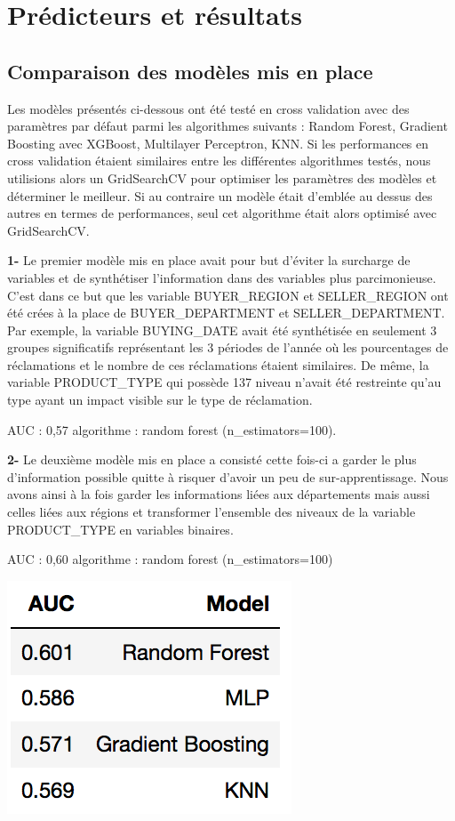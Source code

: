 
\chapter{Prédicteurs et résultats}

\section{Comparaison des modèles mis en place}

Les modèles présentés ci-dessous ont été testé en cross validation avec des
paramètres par défaut parmi les algorithmes suivants : Random Forest, Gradient Boosting 
avec XGBoost, Multilayer Perceptron, KNN.
Si les performances en cross validation étaient similaires entre les différentes algorithmes
testés, nous utilisions alors un GridSearchCV pour optimiser les paramètres des modèles et
déterminer le meilleur. 
Si au contraire un modèle était d'emblée au dessus des autres en termes de performances, 
seul cet algorithme était alors optimisé avec GridSearchCV.

\textbf{1-} Le premier modèle mis en place avait pour but d'éviter la surcharge de variables et de 
synthétiser l'information dans des variables plus parcimonieuse. C'est dans ce but que les 
variable BUYER_REGION et SELLER_REGION ont été crées à la place de BUYER_DEPARTMENT et
SELLER_DEPARTMENT. Par exemple, la variable BUYING_DATE avait été synthétisée en seulement
3 groupes significatifs représentant les 3 périodes de l'année où les pourcentages de 
réclamations et le nombre de ces réclamations étaient similaires. De même, la variable
PRODUCT_TYPE qui possède 137 niveau n'avait été restreinte qu'au type ayant un impact visible
sur le type de réclamation. 

AUC : 0,57
algorithme : random forest (n_estimators=100).

\textbf{2-} Le deuxième modèle mis en place a consisté cette fois-ci a garder le plus d'information
possible quitte à risquer d'avoir un peu de sur-apprentissage. Nous avons ainsi à la fois 
garder les informations liées aux départements mais aussi celles liées aux régions et 
transformer l'ensemble des niveaux de la variable PRODUCT_TYPE en variables binaires.

AUC : 0,60
algorithme : random forest (n_estimators=100)

\begin{center}
\includegraphics[scale=0.5]{assets/auc1} 
\end{center}

